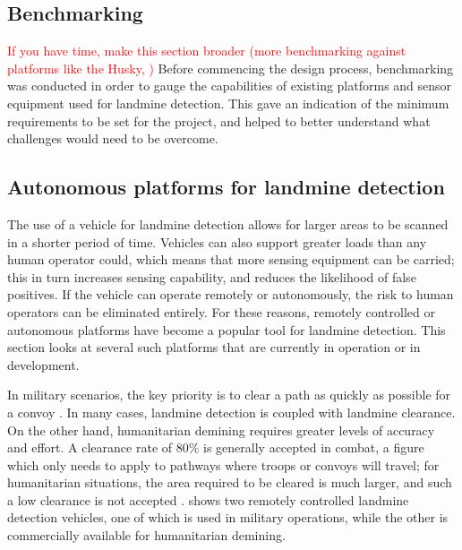 \documentclass[main.tex]{subfiles}
\begin{document}
\begin{appendices}

\chapter{Benchmarking}
\textcolor{red}{If you have time, make this section broader (more benchmarking against platforms like the Husky, )} Before commencing the design process, benchmarking was conducted in order to gauge the capabilities of existing platforms and sensor equipment used for landmine detection. This gave an indication of the minimum requirements to be set for the project, and helped to better understand what challenges would need to be overcome.

\section{Autonomous platforms for landmine detection}
The use of a vehicle for landmine detection allows for larger areas to be scanned in a shorter period of time. Vehicles can also support greater loads than any human operator could, which means that more sensing equipment can be carried; this in turn increases sensing capability, and reduces the likelihood of false positives. If the vehicle can operate remotely or autonomously, the risk to human operators can be eliminated entirely. For these reasons, remotely controlled or autonomous platforms have become a popular tool for landmine detection. This section looks at several such platforms that are currently in operation or in development. 


In military scenarios, the key priority is to clear a path as quickly as possible for a convoy \parencite{portugal2014}. In many cases, landmine detection is coupled with landmine clearance. On the other hand, humanitarian demining requires greater levels of accuracy and effort. A clearance rate of 80\% is generally accepted in combat, a figure which only needs to apply to pathways where troops or convoys will travel; for humanitarian situations, the area required to be cleared is much larger, and such a low clearance is not accepted \parencite{habib2008}.  shows two remotely controlled landmine detection vehicles, one of which is used in military operations, while the other is commercially available for humanitarian demining.   


\end{appendices}
\end{document}
